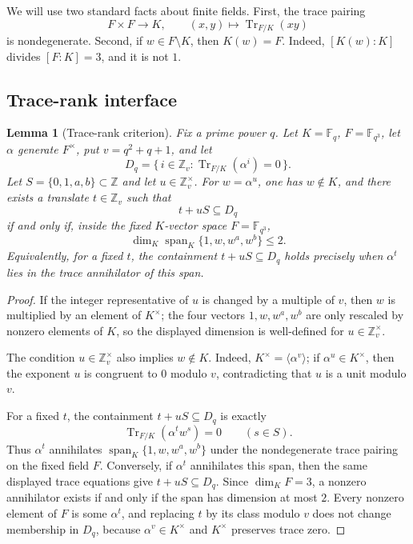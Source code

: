 \documentclass[11pt,letterpaper]{amsart}
\theoremstyle{plain}
\newtheorem{lemma}[theorem]{Lemma}
\newcommand{\F}{\mathbb F}
\newcommand{\Z}{\mathbb Z}
\newcommand{\Tr}{\operatorname{Tr}}
\newcommand{\Span}{\operatorname{span}}
\begin{document}
We will use two standard facts about finite fields.  First, the trace
pairing
\[
 F\times F\longrightarrow K,\qquad (x,y)\longmapsto \Tr_{F/K}(xy)
\]
is nondegenerate.  Second, if \(w\in F\setminus K\), then \(K(w)=F\).
Indeed, \([K(w):K]\) divides \([F:K]=3\), and it is not \(1\).

\subsection*{Trace-rank interface}

\begin{lemma}[Trace-rank criterion]
\label{lem:trace-rank}
Fix a prime power \(q\).  Let \(K=\F_q\), \(F=\F_{q^3}\), let
\(\alpha\) generate \(F^\times\), put \(v=q^2+q+1\), and let
\[
 D_q=\{\,i\in \Z_v:\Tr_{F/K}(\alpha^i)=0\,\}.
\]
Let \(S=\{0,1,a,b\}\subset\Z\) and let \(u\in\Z_v^\times\).  For
\(w=\alpha^u\), one has \(w\notin K\), and there exists a translate
\(t\in\Z_v\) such that
\[
 t+uS\subseteq D_q
\]
if and only if, inside the fixed \(K\)-vector space
\(F=\F_{q^3}\),
\[
 \dim_K\Span_K\{1,w,w^a,w^b\}\leq 2.
\]
Equivalently, for a fixed \(t\), the containment \(t+uS\subseteq D_q\)
holds precisely when \(\alpha^t\) lies in the trace annihilator of this
span.
\end{lemma}

\begin{proof}
If the integer representative of \(u\) is changed by a multiple of
\(v\), then \(w\) is multiplied by an element of \(K^\times\); the four
vectors \(1,w,w^a,w^b\) are only rescaled by nonzero elements of \(K\),
so the displayed dimension is well-defined for \(u\in\Z_v^\times\).

The condition \(u\in\Z_v^\times\) also implies \(w\notin K\).  Indeed,
\(K^\times=\langle\alpha^v\rangle\); if \(\alpha^u\in K^\times\), then
the exponent \(u\) is congruent to \(0\) modulo \(v\), contradicting
that \(u\) is a unit modulo \(v\).

For a fixed \(t\), the containment \(t+uS\subseteq D_q\) is exactly
\[
 \Tr_{F/K}(\alpha^t w^s)=0\qquad(s\in S).
\]
Thus \(\alpha^t\) annihilates
\(\Span_K\{1,w,w^a,w^b\}\) under the nondegenerate trace pairing on the
fixed field \(F\).  Conversely, if \(\alpha^t\) annihilates this span,
then the same displayed trace equations give \(t+uS\subseteq D_q\).
Since \(\dim_K F=3\), a nonzero annihilator exists if and only if the
span has dimension at most \(2\).  Every nonzero element of \(F\) is
some \(\alpha^t\), and replacing \(t\) by its class modulo \(v\) does
not change membership in \(D_q\), because \(\alpha^v\in K^\times\) and
\(K^\times\) preserves trace zero.
\end{proof}
\end{document}
